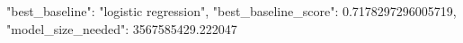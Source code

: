 {
  "best_baseline": "logistic regression",
  "best_baseline_score": 0.7178297296005719,
  "model_size_needed": 3567585429.222047
}